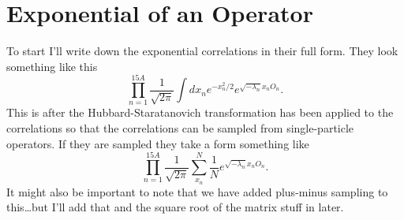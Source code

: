 \section{Exponential of an Operator}
To start I'll write down the exponential correlations in their full form. They look something like this
\begin{equation}
   \prod\limits_{n=1}^{15A} \frac{1}{\sqrt{2\pi}}\int dx_n e^{-x_n^2/2}e^{\sqrt{-\lambda_n}x_nO_n}.
\end{equation}
This is after the Hubbard-Staratanovich transformation has been applied to the correlations so that the correlations can be sampled from single-particle operators. If they are sampled they take a form something like
\begin{equation}
   \prod\limits_{n=1}^{15A} \frac{1}{\sqrt{2\pi}}\sum\limits_{x_n}^N\frac{1}{N}e^{\sqrt{-\lambda_n}x_nO_n}.
\end{equation}
It might also be important to note that we have added plus-minus sampling to this\ldots but I'll add that and the square root of the matrix stuff in later.

